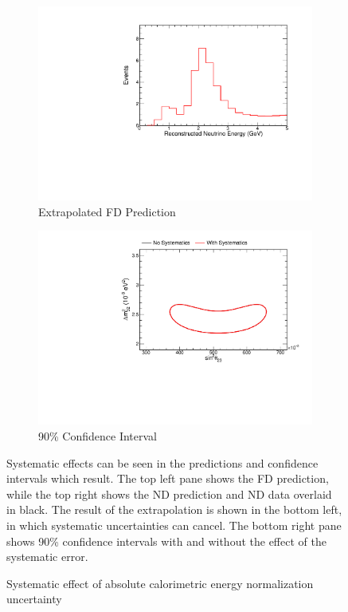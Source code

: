 {\begin{figure}
\begin{center}
\begin{subfigure}[c]{0.49\textwidth}
\includegraphics[width=\textwidth]{figures/systs/prediction/fd_extrap_prediction_calNormAbs.pdf}
\caption*{Extrapolated FD Prediction}
\end{subfigure}
\begin{subfigure}[c]{0.49\textwidth}
\includegraphics[width=\textwidth]{figures/systs/prediction/fd_extrap_contour_calNormAbs.pdf}
\caption*{90\% Confidence Interval}
\end{subfigure}
\end{center}
\caption{Systematic effect of absolute calorimetric energy normalization uncertainty}{
Systematic effects can be seen in the predictions and confidence intervals
which result.
The top left pane shows the FD prediction, while the top right shows the
ND prediction and ND data overlaid in black.
The result of the extrapolation is shown in the bottom left, in which
systematic uncertainties can cancel.
The bottom right pane shows 90\% confidence intervals with and without
the effect of the systematic error.}
\label{syst_fig_calNormAbs}


\end{figure}}
